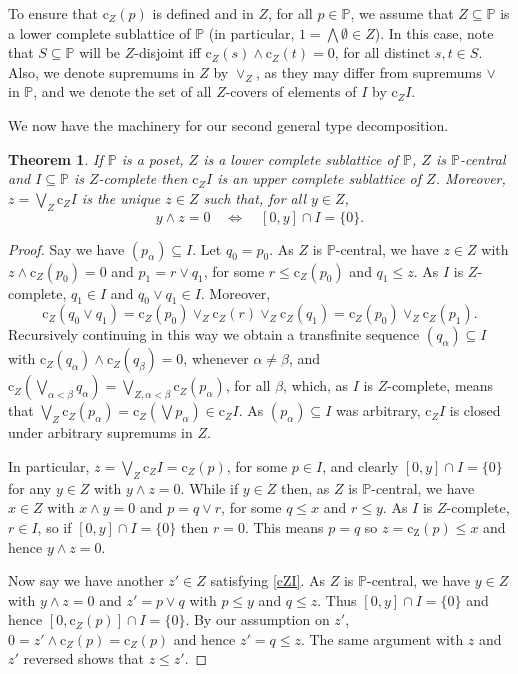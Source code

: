 \documentclass{amsart}
\newtheorem{thm}{Theorem}[section]
\theoremstyle{definition}
\numberwithin{equation}{section}
\begin{document}
To ensure that $\mathrm{c}_Z(p)$ is defined and in $Z$, for all $p\in\mathbb{P}$, we assume that $Z\subseteq\mathbb{P}$ is a lower complete sublattice of $\mathbb{P}$ (in particular, $1=\bigwedge\emptyset\in Z$).  In this case, note that $S\subseteq\mathbb{P}$ will be $Z$-disjoint iff $\mathrm{c}_Z(s)\wedge\mathrm{c}_Z(t)=0$, for all distinct $s,t\in S$.  Also, we denote supremums in $Z$ by $\vee_Z$, as they may differ from supremums $\vee$ in $\mathbb{P}$, and we denote the set of all $Z$-covers of elements of $I$ by $\mathrm{c}_ZI$.

We now have the machinery for our second general type decomposition.

\begin{thm}\label{cZI}
If $\mathbb{P}$ is a poset, $Z$ is a lower complete sublattice of $\mathbb{P}$, $Z$ is $\mathbb{P}$-central and $I\subseteq\mathbb{P}$ is $Z$-complete then $\mathrm{c}_ZI$ is an upper complete sublattice of $Z$.  Moreover, $z=\bigvee_Z\mathrm{c}_ZI$ is the unique $z\in Z$ such that, for all $y\in Z$,
\begin{equation}\label{cZIeq}
y\wedge z=0\quad\Leftrightarrow\quad[0,y]\cap I=\{0\}.
\end{equation}
\end{thm}

\begin{proof} Say we have $(p_\alpha)\subseteq I$.  Let $q_0=p_0$.  As $Z$ is $\mathbb{P}$-central, we have $z\in Z$ with $z\wedge\mathrm{c}_Z(p_0)=0$ and $p_1=r\vee q_1$, for some $r\leq\mathrm{c}_Z(p_0)$ and $q_1\leq z$.  As $I$ is $Z$-complete, $q_1\in I$ and $q_0\vee q_1\in I$.  Moreover, \[\mathrm{c}_Z(q_0\vee q_1)=\mathrm{c}_Z(p_0)\vee_Z\mathrm{c}_Z(r)\vee_Z\mathrm{c}_Z(q_1)=\mathrm{c}_Z(p_0)\vee_Z\mathrm{c}_Z(p_1).\]  Recursively continuing in this way we obtain a transfinite sequence $(q_\alpha)\subseteq I$ with $\mathrm{c}_Z(q_\alpha)\wedge\mathrm{c}_Z(q_\beta)=0$, whenever $\alpha\neq\beta$, and $\mathrm{c}_Z(\bigvee_{\alpha<\beta}q_\alpha)=\bigvee_{Z,\alpha<\beta}\mathrm{c}_Z(p_\alpha)$, for all $\beta$, which, as $I$ is $Z$-complete, means that $\bigvee_Z\mathrm{c}_Z(p_\alpha)=\mathrm{c}_Z(\bigvee p_\alpha)\in\mathrm{c}_ZI$.  As $(p_\alpha)\subseteq I$ was arbitrary, $\mathrm{c}_ZI$ is closed under arbitrary supremums in $Z$.

In particular, $z=\bigvee_Z\mathrm{c}_ZI=\mathrm{c}_Z(p)$, for some $p\in I$, and clearly $[0,y]\cap I=\{0\}$ for any $y\in Z$ with $y\wedge z=0$.  While if $y\in Z$ then, as $Z$ is $\mathbb{P}$-central, we have $x\in Z$ with $x\wedge y=0$ and $p=q\vee r$, for some $q\leq x$ and $r\leq y$.  As $I$ is $Z$-complete, $r\in I$, so if $[0,y]\cap I=\{0\}$ then $r=0$.  This means $p=q$ so $z=\mathrm{c_Z}(p)\leq x$ and hence $y\wedge z=0$.

Now say we have another $z'\in Z$ satisfying \eqref{cZI}.  As $Z$ is $\mathbb{P}$-central, we have $y\in Z$ with $y\wedge z=0$ and $z'=p\vee q$ with $p\leq y$ and $q\leq z$.  Thus $[0,y]\cap I=\{0\}$ and hence $[0,\mathrm{c}_Z(p)]\cap I=\{0\}$.  By our assumption on $z'$, $0=z'\wedge\mathrm{c}_Z(p)=\mathrm{c}_Z(p)$ and hence $z'=q\leq z$.  The same argument with $z$ and $z'$ reversed shows that $z\leq z'$.
\end{proof}
\end{document}
